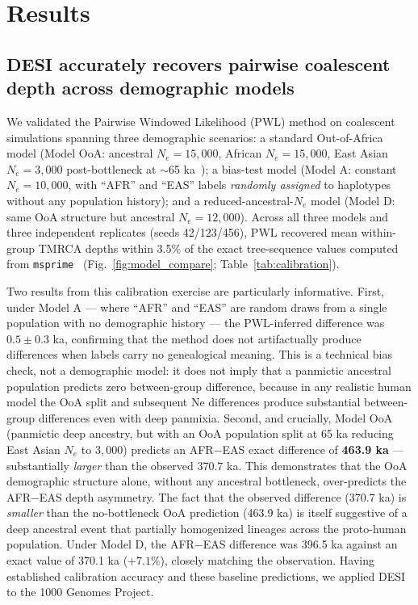 
\section*{Results}

\subsection*{DESI accurately recovers pairwise coalescent depth across demographic models}

We validated the Pairwise Windowed Likelihood (PWL) method on coalescent simulations spanning three demographic scenarios: a standard Out-of-Africa model (Model OoA: ancestral $N_e = 15{,}000$, African $N_e = 15{,}000$, East Asian $N_e = 3{,}000$ post-bottleneck at $\sim$65 ka~\citep{Gutenkunst2009}); a bias-test model (Model A: constant $N_e = 10{,}000$, with ``AFR'' and ``EAS'' labels \textit{randomly assigned} to haplotypes without any population history); and a reduced-ancestral-$N_e$ model (Model D: same OoA structure but ancestral $N_e = 12{,}000$). Across all three models and three independent replicates (seeds 42/123/456), PWL recovered mean within-group TMRCA depths within 3.5\% of the exact tree-sequence values computed from \texttt{msprime}~\citep{Kelleher2016} (Fig.~\ref{fig:model_compare}; Table~\ref{tab:calibration}).

Two results from this calibration exercise are particularly informative. First, under Model A --- where ``AFR'' and ``EAS'' are random draws from a single population with no demographic history --- the PWL-inferred difference was $0.5 \pm 0.3$ ka, confirming that the method does not artifactually produce differences when labels carry no genealogical meaning. This is a technical bias check, not a demographic model: it does not imply that a panmictic ancestral population predicts zero between-group difference, because in any realistic human model the OoA split and subsequent Ne differences produce substantial between-group differences even with deep panmixia. Second, and crucially, Model OoA (panmictic deep ancestry, but with an OoA population split at 65 ka reducing East Asian $N_e$ to $3{,}000$) predicts an AFR$-$EAS exact difference of \textbf{463.9 ka} --- substantially \emph{larger} than the observed 370.7 ka. This demonstrates that the OoA demographic structure alone, without any ancestral bottleneck, over-predicts the AFR$-$EAS depth asymmetry. The fact that the observed difference (370.7 ka) is \emph{smaller} than the no-bottleneck OoA prediction (463.9 ka) is itself suggestive of a deep ancestral event that partially homogenized lineages across the proto-human population. Under Model D, the AFR$-$EAS difference was 396.5 ka against an exact value of 370.1 ka ($+7.1\%$), closely matching the observation. Having established calibration accuracy and these baseline predictions, we applied DESI to the 1000 Genomes Project.

